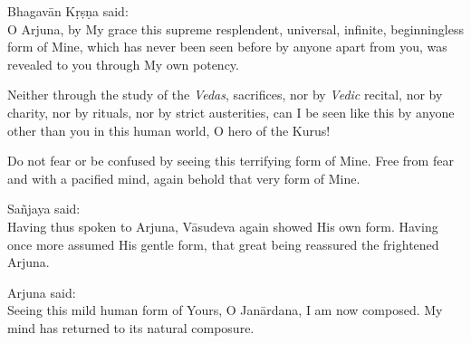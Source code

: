 {\hspace*{1em}Bhagavān Kṛṣṇa said: \\
O Arjuna, by My grace this supreme resplendent, universal, infinite, beginningless form of Mine, which has never been seen before by anyone apart from you, was revealed to you through My own potency.}

{Neither through the study of the \textit{Vedas}, sacrifices, nor by \textit{Vedic} recital, nor by charity, nor by rituals, nor by strict austerities, can I be seen like this by anyone other than you in this human world, O hero of the Kurus!}

{Do not fear or be confused by seeing this terrifying form of Mine. Free from fear and with a pacified mind, again behold that very form of Mine.}

{\hspace*{1em}Sañjaya said: \\
Having thus spoken to Arjuna, Vāsudeva again showed His own form. Having once more assumed His gentle form, that great being reassured the frightened Arjuna.}

{\hspace*{1em}Arjuna said: \\
Seeing this mild human form of Yours, O Janārdana, I am now composed. My mind has returned to its natural composure.}

